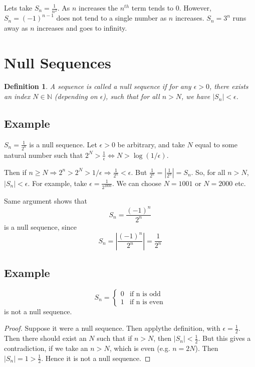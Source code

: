 \documentclass[12pt]{scrbook}
\newtheorem*{definition}{Definition}
\begin{document}
Lets take $S_n = \frac{1}{n^2}$.  As $n$ increases the $n^{th}$ term tends to 0.  However, $S_n = (-1)^{n-1}$ does not tend to a single number as $n$ increases. $S_n  = 3^n$ runs away as $n$ increases and goes to infinity.

\section{Null Sequences}

\begin{definition}
A sequence is called a null sequence if for any $\epsilon > 0$, there exists an index $N \in \mathbb{N}$ (depending on $\epsilon$), such that for all $n > N$, we have $|S_n| < \epsilon$.
\end{definition}

\subsection{Example}
$S_n = \frac{1}{2^n}$ is a null sequence.  Let $\epsilon > 0$ be arbitrary, and take $N$ equal to some natural number such that $2^N > \frac{1}{\epsilon} \Leftrightarrow N > \log(1/\epsilon)$.

Then if $n \ge N \Rightarrow 2^n > 2^N > 1/\epsilon \Rightarrow \frac{1}{2^n} < \epsilon$.  But 
$\frac{1}{2^n} = |\frac{1}{2^n}| = S_n$.  So, for all $n > N$, $|S_n| < \epsilon$.  For example, take $\epsilon = \frac{1}{2^1000}$.
We can choose $N = 1001$ or $N = 2000$ etc.

Same argument shows that
\[ S_n = \frac{(-1)^n}{2^n} \]
is a null sequence, since
\[ S_n = \left| \frac{(-1)^n}{2^n} \right| = \frac{1}{2^n} \]

\subsection{Example}

\[
S_n = 
  \begin{cases}
    0 & \text{if n is odd} \\
    1 & \text{if n is even}
  \end{cases}
\]
is not a null sequence.
\begin{proof}
Suppose it were a null sequence.  Then applythe definition, with $\epsilon = \frac{1}{2}$.  Then there should exist an $N$ such that if $n > N$, then $|S_n| < \frac{1}{2}$.  But this gives a contradiction, if we take an $n > N$, which is even (e.g. $n = 2N$).  
Then $|S_n| = 1 > \frac{1}{2}$.  Hence it is not a null sequence.
\end{proof}
\end{document}
